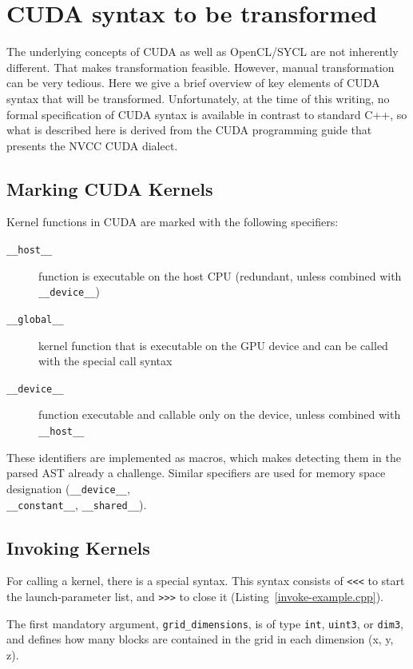 \documentclass[sigconf]{acmart}
\newcommand{\inputcode}[2]{}
\newcommand{\tcode}[1]{\texttt{#1}}
\newcommand{\intt}[1]{\texttt{#1}}
\begin{document}
\section{CUDA syntax to be transformed}
The underlying concepts of CUDA as well as OpenCL/SYCL are not inherently different. That makes transformation feasible. However, manual transformation can be very tedious.
Here we give a brief overview of key elements of CUDA syntax that will be transformed. Unfortunately, at the time of this writing, no formal specification of CUDA syntax is available in contrast to standard C++\cite{isocpp}, so what is described here is derived from  the CUDA programming guide\cite{CUDACProgGuide} that presents the NVCC CUDA dialect.

\subsection{Marking CUDA Kernels}
Kernel functions in CUDA are marked with the following specifiers:
\begin{description}
\item[\tcode{__host__}] function is executable on the host CPU (redundant, unless combined with \tcode{__device__})
\item[\tcode{__global__}] kernel function that is executable on the GPU device and can be called with the special call syntax
\item[\tcode{__device__}] function executable and callable only on the device, unless combined with \tcode{__host__}
\end{description}
These identifiers are implemented as macros, which makes detecting them in the parsed AST already a challenge. Similar specifiers are used for memory space designation (\tcode{__device__}, \\\tcode{__constant__}, \tcode{__shared__}). 


\subsection{Invoking Kernels}
    For calling a kernel, there is a special syntax. This syntax consists of \intt{<{}<{}<} to start the launch-parameter list, and \intt{>{}>{}>} to close it (Listing~\ref{invoke-example.cpp}).
    
    \inputcode{invoke-example.cpp}{Special CUDA kernel invocation syntax}
    
    The first mandatory argument, \intt{grid_dimensions}, is of type \intt{int}, \intt{uint3}, or \intt{dim3}, and defines how many blocks are contained in the grid in each dimension (x, y, z). %
    
\end{document}
